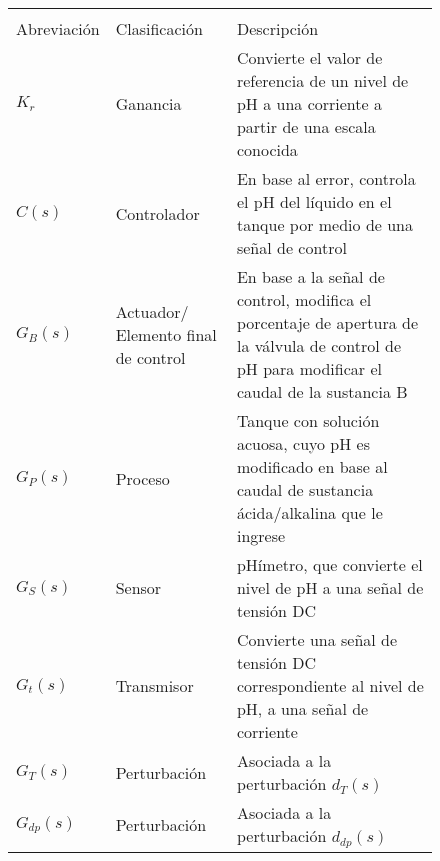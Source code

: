 \begin{figure}[!h]
    \centering
    \setlength\extrarowheight{3mm}
    \begin{tabular}{>{\centering\arraybackslash}p{3cm}p{3cm}p{10cm}}
        \toprule\\[-2.5em]
        Abreviación & Clasificación & Descripción\\
        \midrule
        $K_r$ & Ganancia & Convierte el valor de referencia de un nivel de pH a una corriente a partir de una escala conocida\\
        $C(s)$ & Controlador & En base al error, controla el pH del líquido en el tanque por medio de una señal de control\\
        $G_B(s)$ & Actuador/ \newline Elemento final de control & En base a la señal de control, modifica el porcentaje de apertura de la válvula de control de pH para modificar el caudal de la sustancia B\\
        $G_P(s)$ & Proceso & Tanque con solución acuosa, cuyo pH es modificado en base al caudal de sustancia ácida/alkalina que le ingrese\\
        $G_S(s)$ & Sensor & pHímetro, que convierte el nivel de pH a una señal de tensión DC\\
        $G_t(s)$ & Transmisor & Convierte una señal de tensión DC correspondiente al nivel de pH, a una señal de corriente\\
        $G_T(s)$ & Perturbación & Asociada a la perturbación $d_T(s)$\\
        $G_{dp}(s)$ & Perturbación & Asociada a la perturbación $d_{dp}(s)$\\
        \bottomrule
    \end{tabular}
    \label{t1}
\end{figure}

